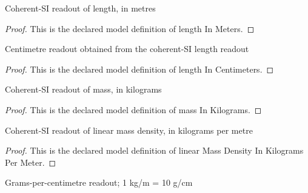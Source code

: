 \begin{definition}
  \label{def:physics:phyx-mini-0948:phyxminiproblems-problemphyxmini0948-lengthinmeters}
  Coherent-SI readout of length, in metres
\end{definition}
\begin{proof}
  This is the declared model definition of length In Meters.
\end{proof}
\begin{definition}
  \label{def:physics:phyx-mini-0948:phyxminiproblems-problemphyxmini0948-lengthincentimeters}
  Centimetre readout obtained from the coherent-SI length readout
\end{definition}
\begin{proof}
  This is the declared model definition of length In Centimeters.
\end{proof}
\begin{definition}
  \label{def:physics:phyx-mini-0948:phyxminiproblems-problemphyxmini0948-massinkilograms}
  Coherent-SI readout of mass, in kilograms
\end{definition}
\begin{proof}
  This is the declared model definition of mass In Kilograms.
\end{proof}
\begin{definition}
  \label{def:physics:phyx-mini-0948:phyxminiproblems-problemphyxmini0948-linearmassdensityinkilogramspermeter}
  Coherent-SI readout of linear mass density, in kilograms per metre
\end{definition}
\begin{proof}
  This is the declared model definition of linear Mass Density In Kilograms Per Meter.
\end{proof}
\begin{definition}
  \label{def:physics:phyx-mini-0948:phyxminiproblems-problemphyxmini0948-linearmassdensityingramspercentimeter}
  Grams-per-centimetre readout; 1 kg/m = 10 g/cm
\end{definition}
